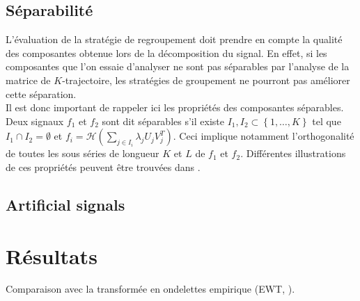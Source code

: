 \documentclass{gretsi}
\begin{document}

\subsection{Séparabilité}
\label{sub:sep}
    L'évaluation de la stratégie de regroupement doit prendre en compte la qualité des composantes obtenue lors de la décomposition du signal. En effet, si les composantes que l'on essaie d'analyser ne sont pas séparables par l'analyse de la matrice de $K$-trajectoire, les stratégies de groupement ne pourront pas améliorer cette séparation.\\
    
    Il est donc important de rappeler ici les propriétés des composantes séparables. Deux signaux $f_1$ et $f_2$ sont dit séparables s'il existe $I_1, I_2 \subset \left \{ 1,\dots, K \right \}$ tel que $I_1\cap I_2 = \emptyset$ et $f_i = \mathcal H(\sum_{j \in I_i} \lambda_j U_j V_j^T)$. Ceci implique notamment l'orthogonalité de toutes les sous séries de longueur $K$ et $L$ de $f_1$ et $f_2$. Différentes illustrations de ces propriétés peuvent être trouvées dans \cite{GNZ_10_SSA}.


\subsection{Artificial signals}
\label{sub:}


\section{Résultats} 

Comparaison avec la transformée en ondelettes empirique (EWT, \cite{gilles_13_EWT}).\\
\end{document}
